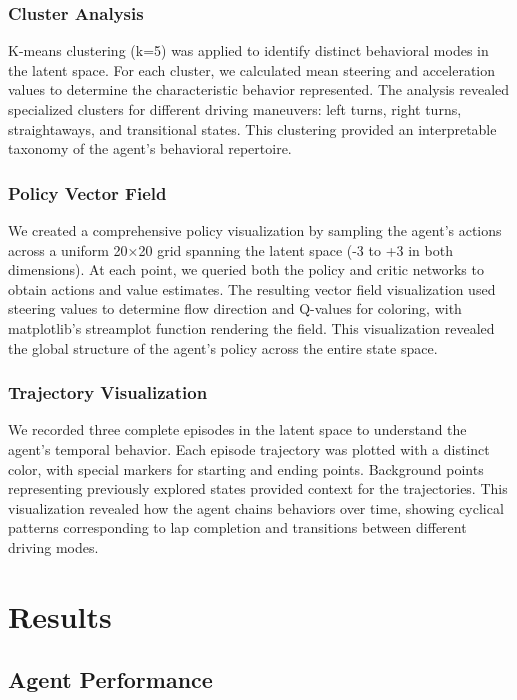 \documentclass[conference]{IEEEtran}
\begin{document}
\subsubsection{Cluster Analysis}
K-means clustering (k=5) was applied to identify distinct behavioral modes in the latent space. For each cluster, we calculated mean steering and acceleration values to determine the characteristic behavior represented. The analysis revealed specialized clusters for different driving maneuvers: left turns, right turns, straightaways, and transitional states. This clustering provided an interpretable taxonomy of the agent's behavioral repertoire.

\subsubsection{Policy Vector Field}
We created a comprehensive policy visualization by sampling the agent's actions across a uniform 20×20 grid spanning the latent space (-3 to +3 in both dimensions). At each point, we queried both the policy and critic networks to obtain actions and value estimates. The resulting vector field visualization used steering values to determine flow direction and Q-values for coloring, with matplotlib's streamplot function rendering the field. This visualization revealed the global structure of the agent's policy across the entire state space.

\subsubsection{Trajectory Visualization}
We recorded three complete episodes in the latent space to understand the agent's temporal behavior. Each episode trajectory was plotted with a distinct color, with special markers for starting and ending points. Background points representing previously explored states provided context for the trajectories. This visualization revealed how the agent chains behaviors over time, showing cyclical patterns corresponding to lap completion and transitions between different driving modes.

\section{Results}

\subsection{Agent Performance}
\end{document}
